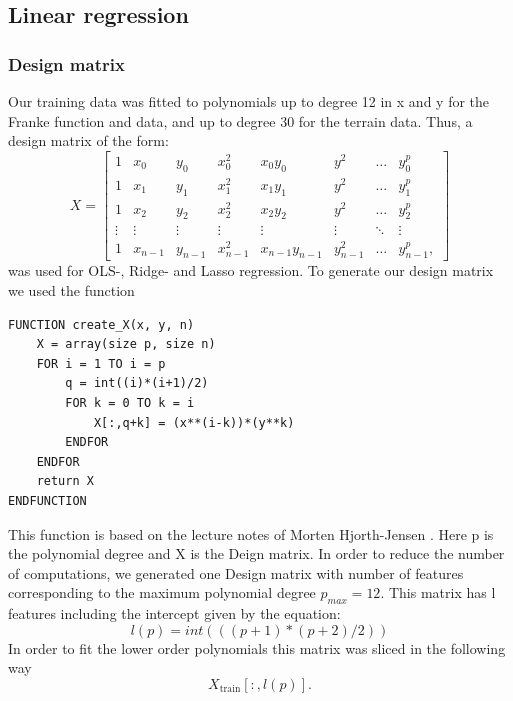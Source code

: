 \subsection{Linear regression}
\subsubsection{Design matrix}

Our training data was fitted to polynomials up
to degree 12 in x and y for the Franke function and data, and up to degree 30
for the terrain data. Thus, a design matrix of the form:
\begin{equation*}
    X = 
    \begin{bmatrix}

        1 & x_{0} & y_0 & x_{0}^{2} & x_0 y_0 & y^2 & \dots &y_{0}^{p} \\
        1 & x_{1} & y_1 & x_{1}^{2} & x_1 y_1 & y^2 & \dots &y_{1}^{p} \\
        1 & x_{2} & y_2 & x_{2}^{2} & x_2 y_2 & y^2 & \dots &y_{2}^{p} \\
        \vdots &\vdots &\vdots &\vdots &\vdots & \vdots & \ddots & \vdots \\
        1&x_{n-1} & y_{n-1} & x_{n-1}^2 & x_{n-1} y_{n-1} & y_{n-1}^2 & \dots &y_{n-1}^{p}, 
    \end{bmatrix}
\end{equation*}
was used for OLS-, Ridge- and Lasso regression. To generate our design matrix we used the function
\begin{lstlisting}
FUNCTION create_X(x, y, n)
	X = array(size p, size n)
	FOR i = 1 TO i = p
		q = int((i)*(i+1)/2)
		FOR k = 0 TO k = i
			X[:,q+k] = (x**(i-k))*(y**k)
		ENDFOR
	ENDFOR
	return X
ENDFUNCTION
\end{lstlisting}
This function is based on the lecture notes of Morten Hjorth-Jensen \cite{w35}.
Here p is the polynomial degree and X is the Deign matrix. 
In order to reduce the number of computations, we generated one Design matrix
with number of features corresponding to the maximum polynomial degree $p_{max}
= 12$. This matrix has l features including the intercept given by the
equation: 
\begin{equation*}
        l(p) = int(((p+1)*(p+2)/2))		
\end{equation*}
In order to fit the lower order polynomials this matrix was sliced in the
following way
\begin{equation*}
    X_{\text{train}}[:,l(p)].
\end{equation*}

